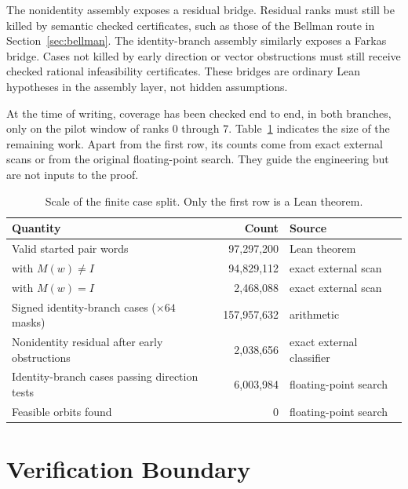 \documentclass[11pt]{article}
\begin{document}
The nonidentity assembly exposes a residual bridge.  Residual ranks must
still be killed by semantic checked certificates, such as those of the
Bellman route in Section~\ref{sec:bellman}.  The identity-branch assembly
similarly exposes a Farkas bridge.  Cases not killed by early direction or
vector obstructions must still receive checked rational infeasibility
certificates.  These bridges are ordinary Lean hypotheses in the assembly
layer, not hidden assumptions.

At the time of writing, coverage has been checked end to end, in both
branches, only on the pilot window of ranks \(0\) through \(7\).
Table~\ref{tab:scale} indicates the size of the remaining work.  Apart from
the first row, its counts come from exact external scans or from the original
floating-point search.  They guide the engineering but are not inputs to the
proof.

\begin{table}[ht]
\centering
\begin{tabular}{@{}lrl@{}}
\toprule
Quantity & Count & Source \\
\midrule
Valid started pair words & 97{,}297{,}200 & Lean theorem \\
\quad with \(M(w)\ne I\) & 94{,}829{,}112 & exact external scan \\
\quad with \(M(w)=I\) & 2{,}468{,}088 & exact external scan \\
Signed identity-branch cases (\(\times 64\) masks) & 157{,}957{,}632 & arithmetic \\
Nonidentity residual after early obstructions & 2{,}038{,}656 & exact external classifier \\
Identity-branch cases passing direction tests & 6{,}003{,}984 & floating-point search \\
Feasible orbits found & 0 & floating-point search \\
\bottomrule
\end{tabular}
\caption{Scale of the finite case split.  Only the first row is a Lean
theorem.}
\label{tab:scale}
\end{table}

\section{Verification Boundary}
\label{sec:validation}
\end{document}

